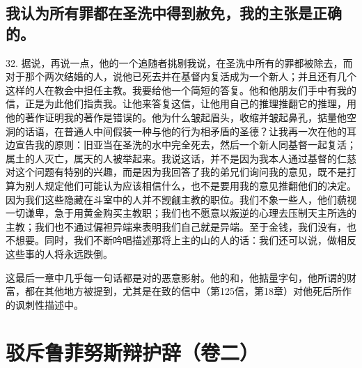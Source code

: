 
\subsection{我认为所有罪都在圣洗中得到赦免，我的主张是正确的。}

32. 据说，再说一点，他的一个追随者挑剔我说，在圣洗中所有的罪都被除去，而对于那个两次结婚的人，说他已死去并在基督内复活成为一个新人；并且还有几个这样的人在教会中担任主教。我要给他一个简短的答复。他和他朋友们手中有我的信，正是为此他们指责我。让他来答复这信，让他用自己的推理推翻它的推理，用他的著作证明我的著作是错误的。他为什么皱起眉头，收缩并皱起鼻孔，掂量他空洞的话语，在普通人中间假装一种与他的行为相矛盾的圣德？让我再一次在他的耳边宣告我的原则：旧亚当在圣洗的水中完全死去，然后一个新人同基督一起复活；属土的人灭亡，属天的人被举起来。我说这话，并不是因为我本人通过基督的仁慈对这个问题有特别的兴趣，而是因为我回答了我的弟兄们询问我的意见，既不是打算为别人规定他们可能认为应该相信什么，也不是要用我的意见推翻他们的决定。因为我们这些隐藏在斗室中的人并不觊觎主教的职位。我们不象一些人，他们藐视一切谦卑，急于用黄金购买主教职；我们也不愿意以叛逆的心理去压制天主所选的主教；我们也不通过偏袒异端来表明我们自己就是异端。至于金钱，我们没有，也不想要。同时，我们不断吟唱描述那将上主的山的人的话：我们还可以说，做相反这些事的人将永远跌倒。\par

这最后一章中几乎每一句话都是对的恶意影射。他的和，他掂量字句，他所谓的财富，都在其他地方被提到，尤其是在致的信中（第125信，第18章）对他死后所作的讽刺性描述中。\par



\section{驳斥鲁菲努斯辩护辞（卷二）}



